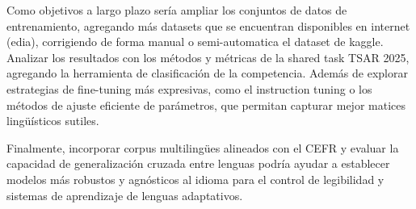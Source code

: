 Como objetivos a largo plazo sería ampliar los conjuntos de datos de entrenamiento, agregando más datasets que se encuentran disponibles en internet (edia), corrigiendo de forma manual o semi-automatica el dataset de kaggle. Analizar los resultados con los métodos y métricas de la shared task TSAR 2025, agregando la herramienta de clasificación de la competencia. Además de explorar estrategias de fine-tuning más expresivas, como el instruction tuning o los métodos de ajuste eficiente de parámetros, que permitan capturar mejor matices lingüísticos sutiles. 

Finalmente, incorporar corpus multilingües alineados con el CEFR y evaluar la capacidad de generalización cruzada entre lenguas podría ayudar a establecer modelos más robustos y agnósticos al idioma para el control de legibilidad y sistemas de aprendizaje de lenguas adaptativos.
